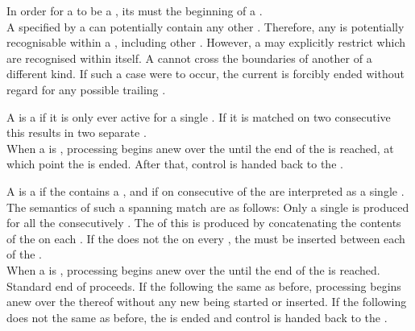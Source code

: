 In order for a  to be a , its  must  the beginning of a . \\

A  specified by a  can potentially contain any other . Therefore, any  is potentially recognisable within a , including other . However, a  may explicitly restrict which  are recognised within itself. A  cannot cross the boundaries of another  of a different kind. If such a case were to occur, the current  is forcibly ended without regard for any possible trailing .

A  is a  if it is only ever active for a single . If it is matched on two consecutive  this results in two separate . \\

When a  is , processing begins anew over the  until the end of the  is reached, at which point the  is ended. After that, control is handed back to the .

A  is a  if the  contains a , and if  on consecutive  of the  are interpreted as a single . The semantics of such a spanning match are as follows: Only a single  is produced for all the consecutively  . The  of this  is produced by concatenating the contents of the  on each . If the  does not  the  on every , the  must be inserted between each  of the . \\

When a  is , processing begins anew over the  until the end of the  is reached. Standard end of   proceeds. If the following   the same  as before, processing begins anew over the  thereof without any new  being started or inserted. If the following  does not  the same  as before, the  is ended and control is handed back to the .

